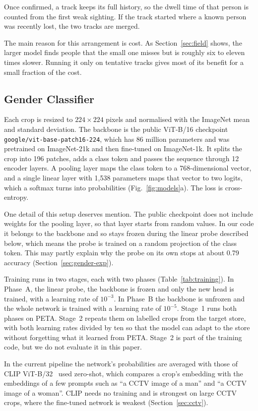 \documentclass[conference]{IEEEtran}
\newcommand{\sci}[1]{$10^{#1}$}
\begin{document}
Once confirmed, a track keeps its full history, so the dwell time of that person
is counted from the first weak sighting. If the track started where a known person
was recently lost, the two tracks are merged.

The main reason for this arrangement is cost. As Section~\ref{sec:field} shows,
the larger model finds people that the small one misses but is roughly six to
eleven times slower. Running it only on tentative tracks gives most of its benefit
for a small fraction of the cost.

\subsection{Gender Classifier}
\label{sec:gender}
Each crop is resized to $224\times224$ pixels and normalised with the ImageNet mean
and standard deviation. The backbone is the public ViT-B/16 checkpoint
\texttt{google/vit-base-patch16-224}, which has 86 million parameters and was
pretrained on ImageNet-21k and then fine-tuned on ImageNet-1k. It splits the crop
into 196 patches, adds a class token and passes the sequence through 12 encoder
layers. A pooling layer maps the class token to a 768-dimensional vector, and a
single linear layer with 1,538 parameters maps that vector to two logits, which a
softmax turns into probabilities (Fig.~\ref{fig:models}a). The loss is
cross-entropy.

One detail of this setup deserves mention. The public checkpoint does not include
weights for the pooling layer, so that layer starts from random values. In our code
it belongs to the backbone and so stays frozen during the linear probe described
below, which means the probe is trained on a random projection of the class token.
This may partly explain why the probe on its own stops at about 0.79 accuracy
(Section~\ref{sec:gender-exp}).

Training runs in two stages, each with two phases (Table~\ref{tab:training}). In
Phase~A, the linear probe, the backbone is frozen and only the new head is trained,
with a learning rate of \sci{-3}. In Phase~B the backbone is unfrozen and the whole
network is trained with a learning rate of \sci{-5}. Stage~1 runs both phases on
PETA. Stage~2 repeats them on labelled crops from the target store, with both
learning rates divided by ten so that the model can adapt to the store without
forgetting what it learned from PETA. Stage~2 is part of the training code, but we
do not evaluate it in this paper.

In the current pipeline the network's probabilities are averaged with those of
CLIP ViT-B/32~\cite{radford2021clip} used zero-shot, which compares a crop's
embedding with the embeddings of a few prompts such as ``a CCTV image of a man''
and ``a CCTV image of a woman''. CLIP needs no training and is strongest on large
CCTV crops, where the fine-tuned network is weakest (Section~\ref{sec:cctv}).
\end{document}
